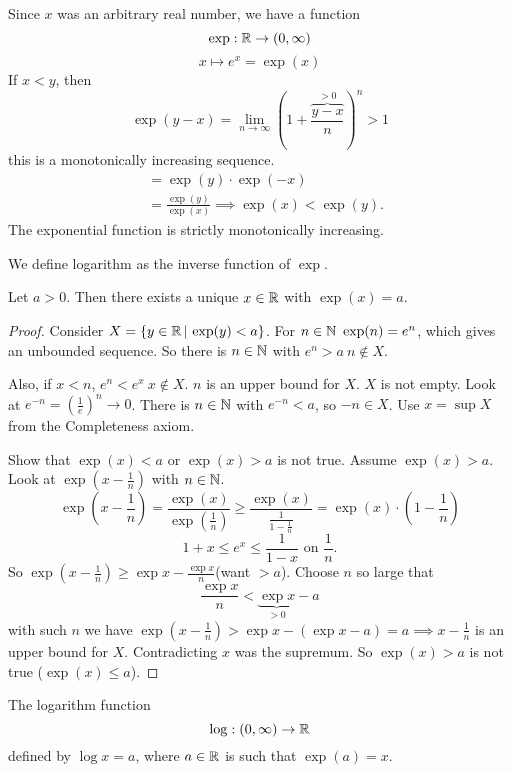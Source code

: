 \documentclass[10pt, a4paper]{article}
\begin{document}
Since $x$ was an arbitrary real number,
we have a function
\[
\exp : \mathbb{R} \to (0, \infty)
\]
\[
x \mapsto e ^ x = \exp(x)
\]
If $x < y$,
then
\[
\exp(y - x) = \lim_{n \to \infty}\left(1 + \frac{\overbrace{y - x}^{>0}}{n}\right) ^ n > 1
\]
this is a monotonically increasing sequence.
\begin{align*}
    &= \exp(y)\cdot\exp(-x) \\
    &= \frac{\exp(y)}{\exp(x)} \implies \exp(x) < \exp(y).
\end{align*}
The exponential function is strictly monotonically increasing.

We define logarithm as the inverse function of $\exp$.
\begin{theorem}
    Let $a > 0$.
    Then there exists a unique $x \in \mathbb{R}$ with $\exp(x) = a$.
    \begin{proof}
        Consider $X = \{y \in \mathbb{R}\,|\,\exp(y) < a\}$.
        For $n \in \mathbb{N}\ \exp(n) = e ^ n$,
        which gives an unbounded sequence.
        So there is $n \in \mathbb{N}$ with $e ^ n > a\ n \notin X$.
        
        Also,
        if $x < n$,
        $e ^ n < e ^ x\ x \notin X$.
        $n$ is an upper bound for $X$.
        $X$ is not empty.
        Look at $e ^ {-n} = \left(\frac{1}{e}\right) ^ n \to 0$.
        There is $n \in \mathbb{N}$ with $e ^ {-n} < a$,
        so $-n \in X$.
        Use $x = \sup X$ from the Completeness axiom.
        
        Show that $\exp(x) < a$ or $\exp(x) > a$ is not true.
        Assume $\exp(x) > a$.
        Look at $\exp\left(x - \frac{1}{n}\right)$ with $n \in \mathbb{N}$.
        \[
        \exp\left(x - \frac{1}{n}\right) = \frac{\exp(x)}{\exp\left(\frac{1}{n}\right)} \geq \frac{\exp(x)}{\frac{1}{1 - \frac{1}{n}}} = \exp(x) \cdot \left(1 - \frac{1}{n}\right)
        \]
        \[
        1 + x \leq e ^ x \leq \frac{1}{1 - x}\text{ on } \frac{1}{n}.
        \]
        So $\exp\left(x - \frac{1}{n}\right) \geq \exp x - \frac{\exp x}{n}$\quad(want $> a$).
        Choose $n$ so large that
        \[
        \frac{\exp x}{n} < \underbrace{\exp x}_{> 0} - a
        \]
        with such $n$ we have $\exp\left(x - \frac{1}{n}\right) > \exp x - (\exp x - a) = a \implies x - \frac{1}{n}$ is an upper bound for $X$. Contradicting $x$ was the supremum.
        So $\exp(x) > a$ is not true ($\exp(x) \leq a$).
    \end{proof}
\end{theorem}

\begin{definition}
    The logarithm function
    \[
    \log : (0, \infty) \to \mathbb{R}
    \]
    defined by
    $\log x = a$,
    where $a \in \mathbb{R}$ is such that $\exp(a) = x$.
\end{definition}
\end{document}
